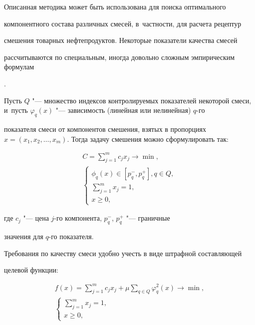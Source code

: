 Описанная методика может быть использована для поиска оптимального

компонентного состава различных смесей, в~частности, для расчета рецептур

смешения товарных нефтепродуктов. Некоторые показатели качества смесей

рассчитываются по специальным, иногда довольно сложным эмпирическим формулам

\cite{livsh:bib19,livsh:bib20}.



Пусть $Q$ "--- множество индексов контролируемых показателей некоторой смеси, и~пусть $\varphi _q (x)$ "--- зависимость (линейная или нелинейная) $q$-го

показателя смеси от компонентов смешения, взятых в пропорциях $x=(x_1 ,x_2

,\ldots,x_m )$. Тогда задачу смешения можно сформулировать так:

\begin{gather*}

C=\sum\limits_{j=1}^m c_j x_j  \to \min ,\\

\begin{cases}

 \phi_q (x)\in \left[p_q^-,p_q^+ \right],q\in Q, \\

 \sum\limits_{j=1}^m x_j =1,\\

 x\ge 0,

\end{cases}

\end{gather*}

где $c_j$ "--- цена $j$-го компонента, $p_q^-$, $p_q^+ $ "--- граничные

значения для $q$-го показателя.



Требования по качеству смеси удобно учесть в виде штрафной составляющей

целевой функции:

\begin{gather}

\label{livshits:eq5}

 f(x)=\sum\limits_{j=1}^m c_j x_j +\mu

\sum\limits_{q\in Q} \varphi _q^2 (x) \to \min,\\

\label{livshits:eq6}

\begin{cases}

\sum\limits_{j=1}^m x_j =1, \\

x\ge 0,

\end{cases}

\end{gather}

